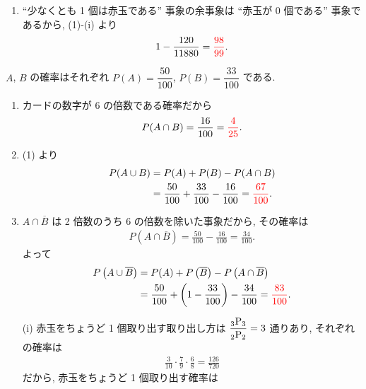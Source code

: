 \begin{qenumerate}
{\begin{enumerate}
{\begin{align}
					\frac{120}{11880} + \frac{1680}{11880} = \red{\frac{5}{33}}.
				\end{align}
			}
			\item{
				``少なくとも 1 個は赤玉である'' 事象の余事象は ``赤玉が 0 個である'' 事象であるから, (1)-(i) より
				\begin{align}
					1 - \frac{120}{11880} = \textcolor{red}{\frac{98}{99}}.
				\end{align}
			}
		\end{enumerate}
	}
	\item{
		$A$, $B$ の確率はそれぞれ $P(A) = \dfrac{50}{100}$, $P(B) = \dfrac{33}{100}$ である.
		\begin{enumerate}
			\item{
				カードの数字が 6 の倍数である確率だから
				\begin{align}
					P(A\cap B) = \frac{16}{100} = \textcolor{red}{\frac{4}{25}}.
				\end{align}
			}
			\item{
				(1) より
				\begin{align}
					P(A\cup B) &= P(A) + P(B) - P(A\cap B) \\
						&= \frac{50}{100} + \frac{33}{100} - \frac{16}{100} = \textcolor{red}{\frac{67}{100}}.
				\end{align}
			}
			\item{
				$A\cap\overline{B}$ は 2 倍数のうち 6 の倍数を除いた事象だから, その確率は
				\begin{align}
					P\left(A\cap\overline{B}\right) = \frac{50}{100} - \frac{16}{100} = \frac{34}{100}.
				\end{align}
				よって
				\begin{align}
					P\left(A\cup\overline{B}\right) &= P(A) + P\left(\overline{B}\right) - P\left(A\cap\overline{B}\right) \\
						&= \frac{50}{100} + \left(1 - \frac{33}{100}\right) - \frac{34}{100} = \textcolor{red}{\frac{83}{100}}.
				\end{align}
			}
		\end{enumerate}
	}
	\item{
		\begin{enumerate}
			\item[(i)]{
				赤玉をちょうど 1 個取り出す取り出し方は $\dfrac{{{}_{3}\mathrm{P}_{3}}}{{{}_{2}\mathrm{P}_{2}}} = 3$ 通りあり, それぞれの確率は
				\begin{align}
					\frac{3}{10}\cdot\frac{7}{9}\cdot\frac{6}{8} = \frac{126}{720}
				\end{align}
				だから, 赤玉をちょうど 1 個取り出す確率は
				\begin{align}

\end{align}}
\end{enumerate}}
\end{qenumerate}
